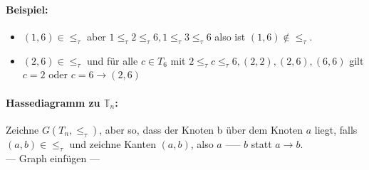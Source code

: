 \paragraph{Beispiel:}
\begin{itemize}
 \item $(1, 6) \in \le_\tau$ aber $1 \le_\tau 2 \le_\tau 6, 1 \le_\tau 3 \le_\tau 6$ also ist $(1, 6) \not\in\le_\tau$.
 \item $(2, 6) \in \le_\tau$ und für alle $c \in T_6$ mit $2 \le_\tau c \le_\tau 6, (2, 2), (2, 6), (6, 6)$ gilt $c = 2$ oder $c = 6 \rightarrow (2, 6)$
\end{itemize}

\paragraph{Hassediagramm zu $\mathbb{T}_n$:}

Zeichne $G (T_n, \le_\tau)$, aber so, dass der Knoten b über dem Knoten $a$ liegt, falls $(a, b) \in \le_\tau$ und zeichne Kanten $(a, b)$, also $a$ ----- $b$ statt $a \longrightarrow b$. \\

--- Graph einfügen ---
